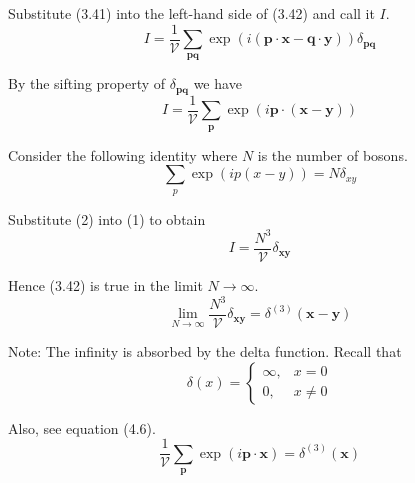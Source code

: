 


\bigskip
Substitute (3.41) into the left-hand side of (3.42) and call it $I$.
\begin{equation*}
I=\frac{1}{\mathcal V}\sum_\mathbf{pq}
\exp(i(\mathbf p\cdot\mathbf x-\mathbf q\cdot\mathbf y))
\delta_\mathbf{pq}
\end{equation*}

By the sifting property of $\delta_\mathbf{pq}$ we have
\begin{equation*}
I=\frac{1}{\mathcal V}\sum_\mathbf{p}
\exp(i\mathbf p\cdot(\mathbf x-\mathbf y))
\tag{1}
\end{equation*}

Consider the following identity where $N$ is the number of bosons.
\begin{equation*}
\sum_p\exp(ip(x-y))=N\delta_{xy}
\tag{2}
\end{equation*}

Substitute (2) into (1) to obtain
\begin{equation*}
I=\frac{N^3}{\mathcal V}\delta_\mathbf{xy}
\end{equation*}

Hence (3.42) is true in the limit $N\rightarrow\infty$.
\begin{equation*}
\lim_{N\rightarrow\infty}\frac{N^3}{\mathcal V}
\delta_\mathbf{xy}
=\delta^{(3)}(\mathbf x-\mathbf y)
\end{equation*}

Note: The infinity is absorbed by the delta function.
Recall that
\begin{equation*}
\delta(x)=\begin{cases}
\infty, & x=0
\\
0, & x\ne0
\end{cases}
\end{equation*}

Also, see equation (4.6).
\begin{equation*}
\frac{1}{\mathcal V}\sum_{\mathbf p}\exp(i\mathbf p\cdot\mathbf x)=\delta^{(3)}(\mathbf x)
\tag{4.6}
\end{equation*}


